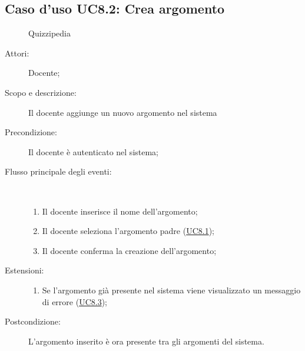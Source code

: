 \subsection{Caso d'uso UC8.2: Crea argomento}
	\begin{figure}[H]
		\centering
		\begin{resizedtikzpicture}{\textwidth}
		\begin{umlsystem}[x=0, fill=lightgray!20]{Quizzipedia}
		\end{umlsystem}
		\end{resizedtikzpicture}
		\caption{}
	\end{figure}
\begin{description}
\item[Attori:] Docente;
\item[Scopo e descrizione:] Il docente aggiunge un nuovo argomento nel sistema
      \item[Precondizione:] Il docente è autenticato nel sistema;

        \item[Flusso principale degli eventi:] \ 
 \begin{enumerate}
          \item Il docente inserisce il nome dell'argomento;
          \item Il docente seleziona l'argomento padre (\hyperlink{UC8.1}{UC8.1});
          \item Il docente conferma la creazione dell'argomento;

      \end{enumerate}
    \item[Estensioni:]
      \begin{enumerate}
          \item Se l'argomento già presente nel sistema viene visualizzato un messaggio di errore (\hyperlink{UC8.3}{UC8.3});

      \end{enumerate}
    \item[Postcondizione:] L'argomento inserito è ora presente tra gli argomenti del sistema.
  \end{description}
\hypertarget{UC8.3}{}
